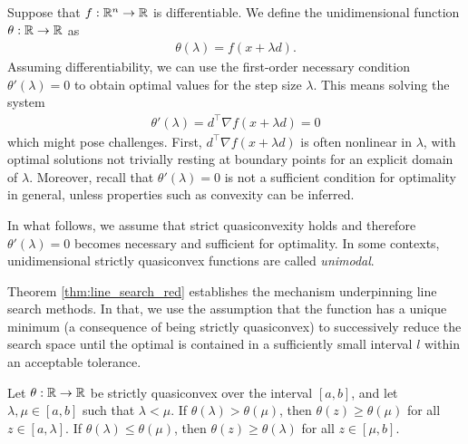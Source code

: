 Suppose that $f: \mathbb{R}^n \to \mathbb{R}$ is differentiable. We define the unidimensional function $\theta: \mathbb{R} \to \mathbb{R}$ as
%
\begin{align*}
\theta(\lambda) = f(x + \lambda d).
\end{align*}
%
Assuming differentiability, we can use the first-order necessary condition $\theta'(\lambda) = 0$ to obtain optimal values for the step size $\lambda$. This means solving the system
%
\begin{align*}
\theta'(\lambda) = d^\top\nabla f(x + \lambda d) = 0
\end{align*}
%
which might pose challenges. First, $d^\top\nabla f(x + \lambda d)$ is often nonlinear in $\lambda$, with optimal solutions not trivially resting at boundary points for an explicit domain of $\lambda$. Moreover, recall that $\theta'(\lambda) = 0$ is not a sufficient condition for optimality in general, unless  properties such as convexity can be inferred. 

In what follows, we assume that strict quasiconvexity holds and therefore $\theta'(\lambda) = 0$ becomes necessary and sufficient for optimality. In some contexts, unidimensional strictly quasiconvex functions are called \emph{unimodal}.

Theorem \ref{thm:line_search_red} establishes the mechanism underpinning line search methods. In that, we use the assumption that the function has a unique minimum (a consequence of being strictly quasiconvex) to successively reduce the search space until the optimal is contained in a sufficiently small interval $l$ within an acceptable tolerance.
%
\begin{theorem}\label{thm:line_search_red}
Let $\theta:\mathbb{R} \rightarrow \mathbb{R}$ be strictly quasiconvex over the interval $[a,b]$, and let $\lambda, \mu \in [a,b]$ such that $\lambda < \mu$. If $\theta(\lambda) > \theta(\mu)$, then $\theta(z) \geq \theta(\mu)$ for all $z \in [a,\lambda]$. If $\theta(\lambda) \leq \theta(\mu)$, then $\theta(z) \geq \theta(\lambda)$ for all $z \in [\mu, b]$.
\end{theorem}

